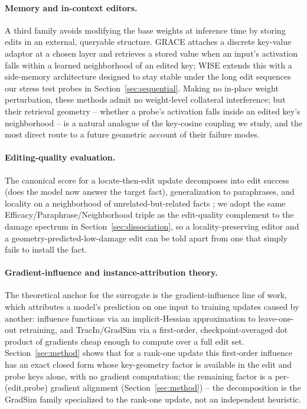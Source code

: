 \paragraph{Memory and in-context editors.} A third family avoids modifying
the base weights at inference time by storing edits in an external, queryable
structure. GRACE \citep{hartvigsen2023grace} attaches a discrete key-value
adaptor at a chosen layer and retrieves a stored value when an input's
activation falls within a learned neighborhood of an edited key; WISE
\citep{wang2024wise} extends this with a side-memory architecture designed to
stay stable under the long edit sequences our stress test probes in
Section~\ref{sec:sequential}. Making no in-place weight perturbation, these
methods admit no weight-level collateral interference; but their retrieval
geometry -- whether a probe's activation falls inside an edited key's
neighborhood -- is a natural analogue of the key-cosine coupling we study, and
the most direct route to a future geometric account of their failure modes.

\paragraph{Editing-quality evaluation.} The canonical score for a
locate-then-edit update decomposes into edit success (does the model now
answer the target fact), generalization to paraphrases, and locality on a
neighborhood of unrelated-but-related facts
\citep{meng2022rome,meng2023memit}; we adopt the same
Efficacy/Paraphrase/Neighborhood triple as the edit-quality complement to the
damage spectrum in Section~\ref{sec:dissociation}, so a locality-preserving
editor and a geometry-predicted-low-damage edit can be told apart from one
that simply fails to install the fact.

\paragraph{Gradient-influence and instance-attribution theory.} The
theoretical anchor for the \SxC{} surrogate is the gradient-influence line of
work, which attributes a model's prediction on one input to training updates
caused by another: influence functions \citep{koh2017influence} via an
implicit-Hessian approximation to leave-one-out retraining, and TracIn/GradSim
\citep{pruthi2020gradsim} via a first-order, checkpoint-averaged dot product of
gradients cheap enough to compute over a full edit set. Section~\ref{sec:method}
shows that for a rank-one update this first-order influence has an exact closed
form whose key-geometry factor is available in the edit and probe keys alone,
with no gradient computation; the remaining factor is a per-(edit,probe)
gradient alignment (Section~\ref{sec:method}) -- the
\SxC{} decomposition is the GradSim family specialized to the rank-one update,
not an independent heuristic.

